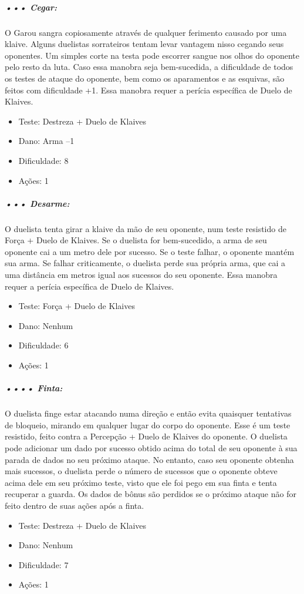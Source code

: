 \subparagraph{\bf ••• Cegar:}
O Garou sangra copiosamente através de qualquer ferimento causado por uma klaive. Alguns duelistas sorrateiros tentam levar vantagem nisso cegando seus oponentes. Um simples corte na testa pode escorrer sangue nos olhos do oponente pelo resto da luta. Caso essa manobra seja bem-sucedida, a dificuldade de todos os testes de ataque do oponente, bem como os aparamentos e as esquivas, são feitos com dificuldade +1. Essa manobra requer a perícia específica de Duelo de Klaives.
\begin{itemize}[noitemsep]
\item Teste: Destreza + Duelo de Klaives
\item Dano: Arma –1
\item Dificuldade: 8
\item Ações: 1
\end{itemize}

\subparagraph{\bf ••• Desarme:}
O duelista tenta girar a klaive da mão de seu oponente, num teste resistido de Força + Duelo de Klaives. Se o duelista for bem-sucedido, a arma de seu oponente cai a um metro dele por sucesso. Se o teste falhar, o oponente mantém sua arma. Se falhar criticamente, o duelista perde sua própria arma, que cai a uma distância em metros igual aos sucessos do seu oponente. Essa manobra requer a perícia específica de Duelo de Klaives.
\begin{itemize}[noitemsep]
\item Teste: Força + Duelo de Klaives
\item Dano: Nenhum
\item Dificuldade: 6 
\item Ações: 1
\end{itemize}

\subparagraph{\bf •••• Finta:}
O duelista finge estar atacando numa direção e então evita quaisquer tentativas de bloqueio, mirando em qualquer lugar do corpo do oponente. Esse é um teste resistido, feito contra a Percepção + Duelo de Klaives do oponente. O duelista pode adicionar um dado por sucesso obtido acima do total de seu oponente à sua parada de dados no seu próximo ataque. No entanto, caso seu oponente obtenha mais sucessos, o duelista perde o número de sucessos que o oponente obteve acima dele em seu próximo teste, visto que ele foi pego em sua finta e tenta recuperar a guarda. Os dados de bônus são perdidos se o próximo ataque não for feito dentro de suas ações após a finta.
\begin{itemize}[noitemsep]
\item Teste: Destreza + Duelo de Klaives
\item Dano: Nenhum
\item Dificuldade: 7
\item Ações: 1
\end{itemize}
   
